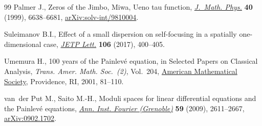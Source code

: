 \documentclass[11pt]{article}
\numberwithin{equation}{section}
\numberwithin{equation}{section}
\begin{document}
\begin{thebibliography}{99}
Palmer J., Zeros of the {J}imbo, {M}iwa, {U}eno tau function, \href{https://doi.org/10.1063/1.533112}{\textit{J.~Math.
 Phys.}} \textbf{40} (1999), 6638--6681, \href{https://arxiv.org/abs/solv-int/9810004}{arXiv:solv-int/9810004}.

Suleimanov B.I., Effect of a small dispersion on self-focusing in a spatially
 one-dimensional case, \href{https://doi.org/10.1134/S0021364017180126}{\textit{JETP Lett.}} \textbf{106} (2017), 400--405.

Umemura H., 100 years of the {P}ainlev\'e equation, in Selected {P}apers on
 {C}lassical {A}nalysis, \textit{Trans. Amer. Math. Soc.~(2)}, Vol.~204,
 \href{https://doi.org/10.1090/trans2/204}{American Mathematical Society}, Providence, RI, 2001, 81--110.

van~der Put M., Saito M.-H., Moduli spaces for linear differential equations and
 the {P}ainlev\'e equations, \href{https://doi.org/10.5802/aif.2502}{\textit{Ann. Inst. Fourier (Grenoble)}}
 \textbf{59} (2009), 2611--2667, \href{https://arxiv.org/abs/0902.1702}{arXiv:0902.1702}.

\end{thebibliography}
\end{document}
